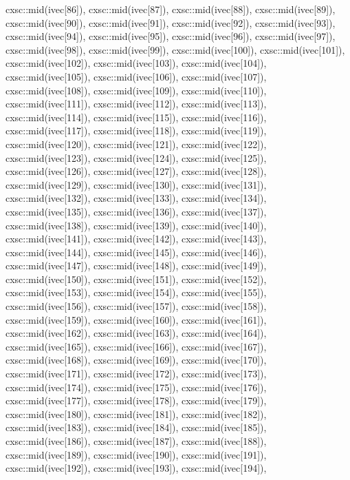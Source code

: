 \begin{DoxyCode}
{  cxsc::mid(ivec[86]),
  cxsc::mid(ivec[87]),
  cxsc::mid(ivec[88]),
  cxsc::mid(ivec[89]),
  cxsc::mid(ivec[90]),
  cxsc::mid(ivec[91]),
  cxsc::mid(ivec[92]),
  cxsc::mid(ivec[93]),
  cxsc::mid(ivec[94]),
  cxsc::mid(ivec[95]),
  cxsc::mid(ivec[96]),
  cxsc::mid(ivec[97]),
  cxsc::mid(ivec[98]),
  cxsc::mid(ivec[99]),
  cxsc::mid(ivec[100]),
  cxsc::mid(ivec[101]),
  cxsc::mid(ivec[102]),
  cxsc::mid(ivec[103]),
  cxsc::mid(ivec[104]),
  cxsc::mid(ivec[105]),
  cxsc::mid(ivec[106]),
  cxsc::mid(ivec[107]),
  cxsc::mid(ivec[108]),
  cxsc::mid(ivec[109]),
  cxsc::mid(ivec[110]),
  cxsc::mid(ivec[111]),
  cxsc::mid(ivec[112]),
  cxsc::mid(ivec[113]),
  cxsc::mid(ivec[114]),
  cxsc::mid(ivec[115]),
  cxsc::mid(ivec[116]),
  cxsc::mid(ivec[117]),
  cxsc::mid(ivec[118]),
  cxsc::mid(ivec[119]),
  cxsc::mid(ivec[120]),
  cxsc::mid(ivec[121]),
  cxsc::mid(ivec[122]),
  cxsc::mid(ivec[123]),
  cxsc::mid(ivec[124]),
  cxsc::mid(ivec[125]),
  cxsc::mid(ivec[126]),
  cxsc::mid(ivec[127]),
  cxsc::mid(ivec[128]),
  cxsc::mid(ivec[129]),
  cxsc::mid(ivec[130]),
  cxsc::mid(ivec[131]),
  cxsc::mid(ivec[132]),
  cxsc::mid(ivec[133]),
  cxsc::mid(ivec[134]),
  cxsc::mid(ivec[135]),
  cxsc::mid(ivec[136]),
  cxsc::mid(ivec[137]),
  cxsc::mid(ivec[138]),
  cxsc::mid(ivec[139]),
  cxsc::mid(ivec[140]),
  cxsc::mid(ivec[141]),
  cxsc::mid(ivec[142]),
  cxsc::mid(ivec[143]),
  cxsc::mid(ivec[144]),
  cxsc::mid(ivec[145]),
  cxsc::mid(ivec[146]),
  cxsc::mid(ivec[147]),
  cxsc::mid(ivec[148]),
  cxsc::mid(ivec[149]),
  cxsc::mid(ivec[150]),
  cxsc::mid(ivec[151]),
  cxsc::mid(ivec[152]),
  cxsc::mid(ivec[153]),
  cxsc::mid(ivec[154]),
  cxsc::mid(ivec[155]),
  cxsc::mid(ivec[156]),
  cxsc::mid(ivec[157]),
  cxsc::mid(ivec[158]),
  cxsc::mid(ivec[159]),
  cxsc::mid(ivec[160]),
  cxsc::mid(ivec[161]),
  cxsc::mid(ivec[162]),
  cxsc::mid(ivec[163]),
  cxsc::mid(ivec[164]),
  cxsc::mid(ivec[165]),
  cxsc::mid(ivec[166]),
  cxsc::mid(ivec[167]),
  cxsc::mid(ivec[168]),
  cxsc::mid(ivec[169]),
  cxsc::mid(ivec[170]),
  cxsc::mid(ivec[171]),
  cxsc::mid(ivec[172]),
  cxsc::mid(ivec[173]),
  cxsc::mid(ivec[174]),
  cxsc::mid(ivec[175]),
  cxsc::mid(ivec[176]),
  cxsc::mid(ivec[177]),
  cxsc::mid(ivec[178]),
  cxsc::mid(ivec[179]),
  cxsc::mid(ivec[180]),
  cxsc::mid(ivec[181]),
  cxsc::mid(ivec[182]),
  cxsc::mid(ivec[183]),
  cxsc::mid(ivec[184]),
  cxsc::mid(ivec[185]),
  cxsc::mid(ivec[186]),
  cxsc::mid(ivec[187]),
  cxsc::mid(ivec[188]),
  cxsc::mid(ivec[189]),
  cxsc::mid(ivec[190]),
  cxsc::mid(ivec[191]),
  cxsc::mid(ivec[192]),
  cxsc::mid(ivec[193]),
  cxsc::mid(ivec[194]),
}
\end{DoxyCode}
